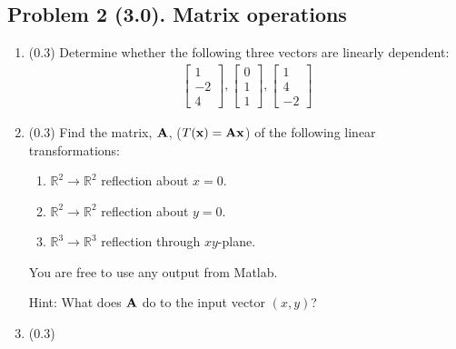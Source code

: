 \documentclass[11pt,titlepage,fleqn]{article}
\begin{document}

\subsection*{Problem 2 (3.0). Matrix operations}

\begin{enumerate}

\item (0.3) Determine whether the following three vectors are linearly dependent:
%
\begin{eqnarray*}
\left[ \begin{array}{r} 1 \\ -2 \\ 4  \end{array} \right],
\left[ \begin{array}{r} 0 \\ 1 \\ 1 \end{array} \right],
\left[ \begin{array}{r} 1 \\ 4 \\ -2 \end{array} \right]
\end{eqnarray*}


\item (0.3) Find the matrix, $\mbox{${\bf A}$}$, ($T(\mbox{${\bf x}$}) = \mbox{${\bf A}$}\mbox{${\bf x}$}$) of the following linear transformations:
%
\begin{enumerate}
\item $\mathbb{R}^2 \rightarrow \mathbb{R}^2$ reflection about $x = 0$.
\item $\mathbb{R}^2 \rightarrow \mathbb{R}^2$ reflection about $y = 0$.
\item $\mathbb{R}^3 \rightarrow \mathbb{R}^3$ reflection through $xy$-plane.
\end{enumerate}
%
You are free to use any output from Matlab.

Hint: What does $\mbox{${\bf A}$}$ do to the input vector $(x,y)$?


\item (0.3)


\end{enumerate}
\end{document}
